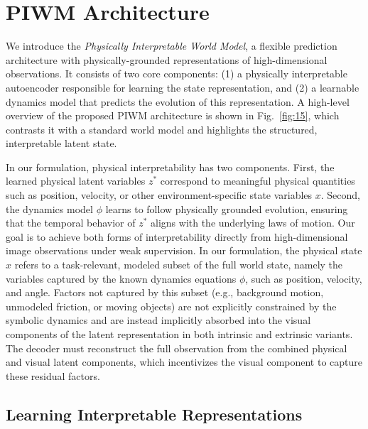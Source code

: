 \documentclass[nonacm,sigconf]{acmart}
\begin{document}


\section{PIWM Architecture}\label{sec:architecture}

We introduce the \textit{Physically Interpretable World Model}, a flexible prediction architecture with physically-grounded representations of high-dimensional observations. It consists of two core components: (1) a {physically interpretable autoencoder} responsible for learning the state representation, and (2) a {learnable dynamics model} that predicts the evolution of this representation. A high-level overview of the proposed PIWM architecture is shown in Fig.~\ref{fig:15}, which contrasts it with a standard world model and highlights the structured, interpretable latent state. 

In our formulation, physical interpretability has two components. 
First, the learned physical latent variables $z^*$ correspond to meaningful physical quantities such as position, velocity, or other environment-specific state variables $x$. 
Second, the dynamics model $\phi$ learns to follow physically grounded evolution, ensuring that the temporal behavior of $z^*$ aligns with the underlying laws of motion. 
Our goal is to achieve both forms of interpretability directly from high-dimensional image observations under weak supervision. In our formulation, the physical state $x$ refers to a task-relevant, modeled subset of the full world state, namely the variables captured by the known dynamics equations $\phi$, such as position, velocity, and angle. Factors not captured by this subset (e.g., background motion, unmodeled friction, or moving objects) are not explicitly constrained by the symbolic dynamics and are instead implicitly absorbed into the visual components of the latent representation in both intrinsic and extrinsic variants. The decoder must reconstruct the full observation from the combined physical and visual latent components, which incentivizes the visual component to capture these residual factors.

\subsection{Learning Interpretable Representations}
\end{document}
